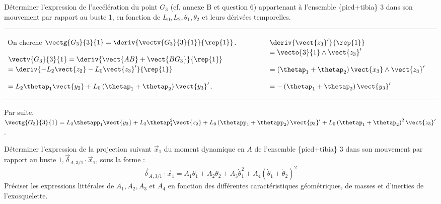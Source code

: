 \documentclass[11pt]{article}
\begin{document}
\UPSTIquestion Déterminer l'expression de l'accélération du point $G_{3}$ (cf. annexe B et question 6) appartenant à l'ensemble \{pied+tibia\} 3 dans son mouvement par rapport au buste 1, en fonction de $L_{0}, L_{2}, \theta_{1}, \theta_{2}$ et leurs dérivées temporelles.

\begin{UPSTIcorrige}
\begin{tabular}{p{.68\linewidth}| p{.3\linewidth}}
On cherche $\vectg{G_3}{3}{1} = \deriv{\vectv{G_3}{3}{1}}{\rep{1}}$.

$\vectv{G_3}{3}{1} = \deriv{\vect{AB}+\vect{BG_3}}{\rep{1}}$
$= \deriv{-L_2 \vect{z_2} -L_0 \vect{z_3}'}{\rep{1}}$

$=L_2 \thetap_1\vect{y_2}  +L_0  \left(\thetap_1 + \thetap_2 \right)\vect{y_3}'$.
&
$\deriv{\vect{z_3}'}{\rep{1}} $ $=\vecto{3}{1}\wedge \vect{z_3}' $

$= \left(\thetap_1 + \thetap_2 \right)\vect{x_3} \wedge \vect{z_3}' $

$= - \left(\thetap_1 + \thetap_2 \right)\vect{y_3}' $ 
\\
\end{tabular}

Par suite, 
$\vectg{G_3}{3}{1} = L_2 \thetapp_1\vect{y_2}  +L_2 \thetap_1^2\vect{z_2}  + L_0  \left(\thetapp_1 + \thetapp_2 \right)\vect{y_3}'+ L_0  \left(\thetap_1 + \thetap_2 \right)^2\vect{z_3}'$.


\end{UPSTIcorrige}

\UPSTIquestion Déterminer l'expression de la projection suivant $\vec{x}_{1}$ du moment dynamique en $A$ de l'ensemble \{pied+tibia\} 3 dans son mouvement par rapport au buste $1, \vec{\delta}_{A, 3 / 1} \cdot \vec{x}_{1}$, sous la forme :
$$
\vec{\delta}_{A, 3 / 1} \cdot \vec{x}_{1}=A_{1} \ddot{\theta}_{1}+A_{2} \ddot{\theta}_{2}+A_{3} \dot{\theta}_{1}^{2}+A_{4}\left(\dot{\theta}_{1}+\dot{\theta}_{2}\right)^{2}
$$
Préciser les expressions littérales de $A_{1}, A_{2}, A_{3}$ et $A_{4}$ en fonction des différentes caractéristiques géométriques, de masses et d'inerties de l'exosquelette.
\end{document}
